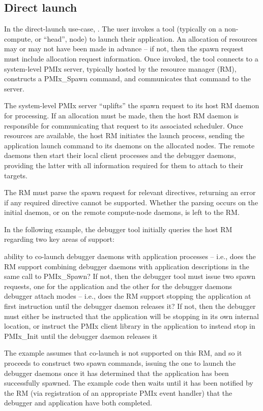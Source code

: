 \subsection{Direct launch}

In the direct-launch use-case, . The user invokes a tool (typically on a non-compute, or “head”, node) to launch their application. An allocation of resources may or may not have been made in advance – if not, then the spawn request must include allocation request information. Once invoked, the tool connects to a system-level PMIx server, typically hosted by the resource manager (RM), constructs a PMIx_Spawn command, and communicates that command to the server.

The system-level PMIx server “uplifts” the spawn request to its host RM daemon for processing. If an allocation must be made, then the host RM daemon is responsible for communicating that request to its associated scheduler. Once resources are available, the host RM initiates the launch process, sending the application launch command to its daemons on the allocated nodes. The remote daemons then start their local client processes and the debugger daemons, providing the latter with all information required for them to attach to their targets.

The RM must parse the spawn request for relevant directives, returning an error if any required directive cannot be supported. Whether the parsing occurs on the initial daemon, or on the remote compute-node daemons, is left to the RM.

In the following example, the debugger tool initially queries the host RM regarding two key areas of support:

    ability to co-launch debugger daemons with application processes – i.e., does the RM support combining debugger daemons with application descriptions in the same call to PMIx_Spawn? If not, then the debugger tool must issue two spawn requests, one for the application and the other for the debugger daemons
    debugger attach modes – i.e., does the RM support stopping the application at first instruction until the debugger daemon releases it? If not, then the debugger must either be instructed that the application will be stopping in its own internal location, or instruct the PMIx client library in the application to instead stop in PMIx_Init until the debugger daemon releases it

The example assumes that co-launch is not supported on this RM, and so it proceeds to construct two spawn commands, issuing the one to launch the debugger daemons once it has determined that the application has been successfully spawned. The example code then waits until it has been notified by the RM (via registration of an appropriate PMIx event handler) that the debugger and application have both completed.



